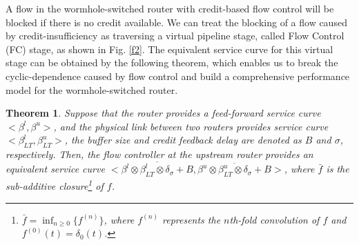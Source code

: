 \documentclass[preprint]{elsarticle}
\newtheorem{thm}{Theorem}
\begin{document}
A flow in the wormhole-switched router with credit-based flow control will be blocked if there is no credit available. We can treat the blocking of a flow caused by credit-insufficiency as traversing a virtual pipeline stage, called Flow Control (FC) stage, as shown in Fig. \ref{f2}. The equivalent service curve for this virtual stage can be obtained by the following theorem, which enables us to break the cyclic-dependence caused by flow control and build a comprehensive performance model for the wormhole-switched router.
\begin{thm}\label{credit}
Suppose that the router provides a feed-forward service curve $<\beta^l,\beta^u>$, and the physical link between two routers provides service curve $<\beta_{LT}^l,\beta_{LT}^u>$, the buffer size and credit feedback delay are denoted as $B$ and $\sigma$, respectively. Then, the flow controller at the upstream router provides an equivalent service curve $<\overline{\beta^l\otimes\beta_{LT}^l\otimes\delta_{\sigma}+B},\overline{\beta^u\otimes\beta_{LT}^u\otimes\delta_{\sigma}+B}>$, where $\bar{f}$ is the sub-additive closure\footnote{$\bar{f}=\inf_{n\geq 0}\{f^{(n)}\}$, where $f^{(n)}$ represents the $n$th-fold convolution of $f$ and $f^{(0)}(t)=\delta_0(t)$.} of $f$.
\end{thm}
\end{document}
